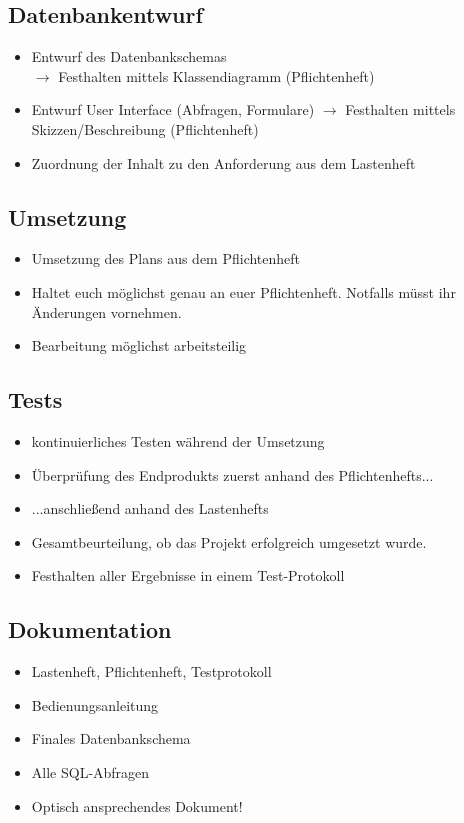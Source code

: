 \subsection{Datenbankentwurf}
\begin{itemize}
    \item Entwurf des Datenbankschemas\\
    $\rightarrow$ Festhalten mittels Klassendiagramm (Pflichtenheft)
    \item Entwurf User Interface (Abfragen, Formulare)
    $\rightarrow$ Festhalten mittels Skizzen/Beschreibung (Pflichtenheft)
    \item Zuordnung der Inhalt zu den Anforderung aus dem Lastenheft
\end{itemize}

\subsection{Umsetzung}
\begin{itemize}
    \item Umsetzung des Plans aus dem Pflichtenheft
    \item Haltet euch möglichst genau an euer Pflichtenheft. Notfalls müsst ihr Änderungen vornehmen.
    \item Bearbeitung möglichst arbeitsteilig
\end{itemize}

\subsection{Tests}
\begin{itemize}
    \item kontinuierliches Testen während der Umsetzung
    \item Überprüfung des Endprodukts zuerst anhand des Pflichtenhefts...
    \item ...anschließend anhand des Lastenhefts
    \item Gesamtbeurteilung, ob das Projekt erfolgreich umgesetzt wurde.
    \item Festhalten aller Ergebnisse in einem Test-Protokoll 
\end{itemize}

\subsection{Dokumentation}
\begin{itemize}
    \item Lastenheft, Pflichtenheft, Testprotokoll
    \item Bedienungsanleitung
    \item Finales Datenbankschema
    \item Alle SQL-Abfragen
    \item Optisch ansprechendes Dokument!
\end{itemize}

